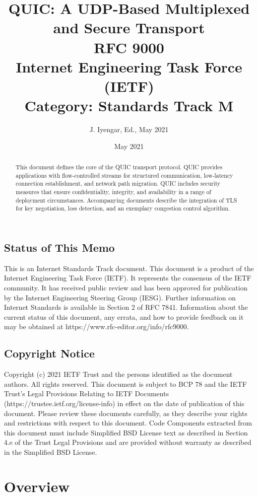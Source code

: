 \documentclass{article}
\title{QUIC: A UDP-Based Multiplexed and Secure Transport\\[1em]
\large RFC 9000\\
Internet Engineering Task Force (IETF)\\
Category: Standards Track                                M}
\author{J. Iyengar, Ed., May 2021}
\date{May 2021}
\begin{document}
\maketitle

\begin{abstract}
This document defines the core of the QUIC transport protocol.  QUIC provides applications with flow-controlled streams for structured communication, low-latency connection establishment, and network path migration.  QUIC includes security measures that ensure confidentiality, integrity, and availability in a range of deployment circumstances.  Accompanying documents describe the integration of TLS for key negotiation, loss detection, and an exemplary congestion control algorithm.
\end{abstract}

\subsection*{Status of This Memo}
This is an Internet Standards Track document. This document is a product of the Internet Engineering Task Force (IETF).  It represents the consensus of the IETF community.  It has received public review and has been approved for publication by the Internet Engineering Steering Group (IESG).  Further information on Internet Standards is available in Section 2 of RFC 7841. Information about the current status of this document, any errata, and how to provide feedback on it may be obtained at https://www.rfc-editor.org/info/rfc9000.

\subsection*{Copyright Notice}
Copyright (c) 2021 IETF Trust and the persons identified as the document authors.  All rights reserved. This document is subject to BCP 78 and the IETF Trust's Legal Provisions Relating to IETF Documents (https://trustee.ietf.org/license-info) in effect on the date of publication of this document.  Please review these documents carefully, as they describe your rights and restrictions with respect to this document.  Code Components extracted from this document must include Simplified BSD License text as described in Section 4.e of the Trust Legal Provisions and are provided without warranty as described in the Simplified BSD License.

\tableofcontents
\newpage

\section{Overview}
\end{document}
